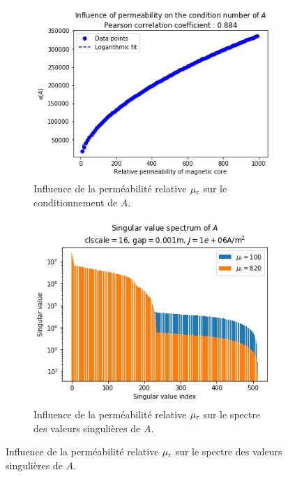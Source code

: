 \documentclass[11pt]{article}
\begin{document}
\begin{figure}[H]
\begin{subfigure}[t]{0.24\textwidth}
		\label{fig:gapspec}
	\end{subfigure}\hfill
	\begin{subfigure}[t]{0.24\textwidth}
		\centering
		\includegraphics[width=\linewidth]{mucond.png}
		\caption{Influence de la perméabilité relative $\mu_{\textnormal{r}}$ sur le conditionnement de $A$.}
		\label{fig:mucond}
	\end{subfigure}\hfill
	\begin{subfigure}[t]{0.24\textwidth}
		\centering
		\includegraphics[width=\linewidth]{muspec.png}
		\caption{Influence de la perméabilité relative $\mu_{\textnormal{r}}$ sur le spectre des valeurs singulières de $A$.}
		\label{fig:muspec}
	\end{subfigure}

\end{figure}
\end{document}
